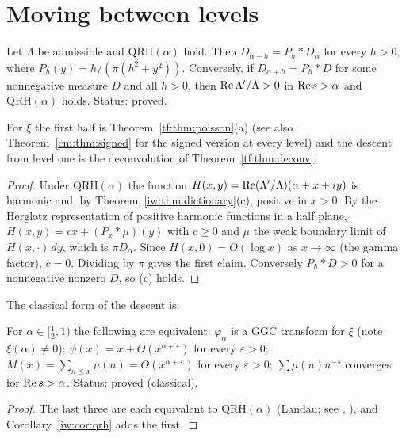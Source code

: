 \section{Moving between levels}\label{iw:sec:levels}

\begin{theorem}\label{iw:thm:semigroup}
Let $\Lambda$ be admissible and $\mathrm{QRH}(\alpha)$ hold. Then $D_{\alpha+h}=P_h*D_\alpha$ for every $h>0$, where $P_h(y)=h/(\pi(h^2+y^2))$. Conversely, if $D_{\alpha+h}=P_h*D$ for some nonnegative measure $D$ and all $h>0$, then $\operatorname{Re}\Lambda'/\Lambda>0$ in $\operatorname{Re} s>\alpha$ and $\mathrm{QRH}(\alpha)$ holds. Status: proved.
\end{theorem}

For $\xi$ the first half is Theorem~\ref{tf:thm:poisson}(a) (see also Theorem~\ref{cm:thm:signed} for the signed version at every level) and the descent from level one is the deconvolution of Theorem~\ref{tf:thm:deconv}.

\begin{proof}
Under $\mathrm{QRH}(\alpha)$ the function $H(x,y)=\operatorname{Re}(\Lambda'/\Lambda)(\alpha+x+iy)$ is harmonic and, by Theorem~\ref{iw:thm:dictionary}(c), positive in $x>0$. By the Herglotz representation of positive harmonic functions in a half plane, $H(x,y)=cx+(P_x*\mu)(y)$ with $c\ge0$ and $\mu$ the weak boundary limit of $H(x,\cdot)\,dy$, which is $\pi D_\alpha$. Since $H(x,0)=O(\log x)$ as $x\to\infty$ (the gamma factor), $c=0$. Dividing by $\pi$ gives the first claim. Conversely $P_h*D>0$ for a nonnegative nonzero $D$, so (c) holds. \end{proof}

The classical form of the descent is:

\begin{proposition}\label{iw:prop:mobius}
For $\alpha\in[\frac12,1)$ the following are equivalent: $\varphi_\alpha$ is a GGC transform for $\xi$ (note $\xi(\alpha)\ne0$); $\psi(x)=x+O(x^{\alpha+\varepsilon})$ for every $\varepsilon>0$; $M(x)=\sum_{n\le x}\mu(n)=O(x^{\alpha+\varepsilon})$ for every $\varepsilon>0$; $\sum\mu(n)n^{-s}$ converges for $\operatorname{Re} s>\alpha$. Status: proved (classical).
\end{proposition}

\begin{proof}
The last three are each equivalent to $\mathrm{QRH}(\alpha)$ (Landau; see \cite[Ch.~14]{Titchmarsh}, \cite{Ingham32}), and Corollary~\ref{iw:cor:qrh} adds the first.
\end{proof}

